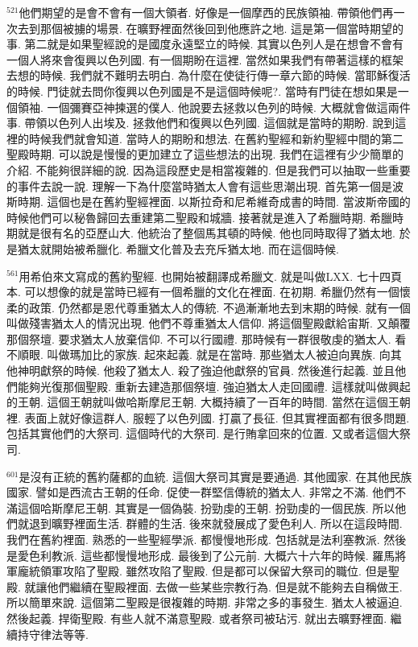 \documentclass{book}
\begin{document}
$^{521}$他們期望的是會不會有一個大領者.
好像是一個摩西的民族領袖.
帶領他們再一次去到那個被擄的場景.
在曠野裡面然後回到他應許之地.
這是第一個當時期望的事.
第二就是如果聖經說的是國度永遠堅立的時候.
其實以色列人是在想會不會有一個人將來會復興以色列國.
有一個期盼在這裡.
當然如果我們有帶著這樣的框架去想的時候.
我們就不難明去明白.
為什麼在使徒行傳一章六節的時候.
當耶穌復活的時候.
門徒就去問你復興以色列國是不是這個時候呢?.
當時有門徒在想如果是一個領袖.
一個彌賽亞神揀選的僕人.
他說要去拯救以色列的時候.
大概就會做這兩件事.
帶領以色列人出埃及.
拯救他們和復興以色列國.
這個就是當時的期盼.
說到這裡的時候我們就會知道.
當時人的期盼和想法.
在舊約聖經和新約聖經中間的第二聖殿時期.
可以說是慢慢的更加建立了這些想法的出現.
我們在這裡有少少簡單的介紹.
不能夠很詳細的說.
因為這段歷史是相當複雜的.
但是我們可以抽取一些重要的事件去說一說.
理解一下為什麼當時猶太人會有這些思潮出現.
首先第一個是波斯時期.
這個也是在舊約聖經裡面.
以斯拉奇和尼希維奇成書的時間.
當波斯帝國的時候他們可以秘魯歸回去重建第二聖殿和城牆.
接著就是進入了希臘時期.
希臘時期就是很有名的亞歷山大.
他統治了整個馬其頓的時候.
他也同時取得了猶太地.
於是猶太就開始被希臘化.
希臘文化普及去充斥猶太地.
而在這個時候.

$^{561}$用希伯來文寫成的舊約聖經.
也開始被翻譯成希臘文.
就是叫做LXX.
七十四頁本.
可以想像的就是當時已經有一個希臘的文化在裡面.
在初期.
希臘仍然有一個懷柔的政策.
仍然都是恩代尊重猶太人的傳統.
不過漸漸地去到末期的時候.
就有一個叫做殘害猶太人的情況出現.
他們不尊重猶太人信仰.
將這個聖殿獻給宙斯.
又顛覆那個祭壇.
要求猶太人放棄信仰.
不可以行國禮.
那時候有一群很敬虔的猶太人.
看不順眼.
叫做瑪加比的家族.
起來起義.
就是在當時.
那些猶太人被迫向異族.
向其他神明獻祭的時候.
他殺了猶太人.
殺了強迫他獻祭的官員.
然後進行起義.
並且他們能夠光復那個聖殿.
重新去建造那個祭壇.
強迫猶太人走回國禮.
這樣就叫做興起的王朝.
這個王朝就叫做哈斯摩尼王朝.
大概持續了一百年的時間.
當然在這個王朝裡.
表面上就好像這群人.
服輕了以色列國.
打贏了長征.
但其實裡面都有很多問題.
包括其實他們的大祭司.
這個時代的大祭司.
是行賄拿回來的位置.
又或者這個大祭司.

$^{601}$是沒有正統的舊約薩都的血統.
這個大祭司其實是要通過.
其他國家.
在其他民族國家.
譬如是西流古王朝的任命.
促使一群堅信傳統的猶太人.
非常之不滿.
他們不滿這個哈斯摩尼王朝.
其實是一個偽裝.
扮勁虔的王朝.
扮勁虔的一個民族.
所以他們就退到曠野裡面生活.
群體的生活.
後來就發展成了愛色利人.
所以在這段時間.
我們在舊約裡面.
熟悉的一些聖經學派.
都慢慢地形成.
包括就是法利塞教派.
然後是愛色利教派.
這些都慢慢地形成.
最後到了公元前.
大概六十六年的時候.
羅馬將軍龐統領軍攻陷了聖殿.
雖然攻陷了聖殿.
但是都可以保留大祭司的職位.
但是聖殿.
就讓他們繼續在聖殿裡面.
去做一些某些宗教行為.
但是就不能夠去自稱做王.
所以簡單來說.
這個第二聖殿是很複雜的時期.
非常之多的事發生.
猶太人被逼迫.
然後起義.
捍衛聖殿.
有些人就不滿意聖殿.
或者祭司被玷污.
就出去曠野裡面.
繼續持守律法等等.
\end{document}
